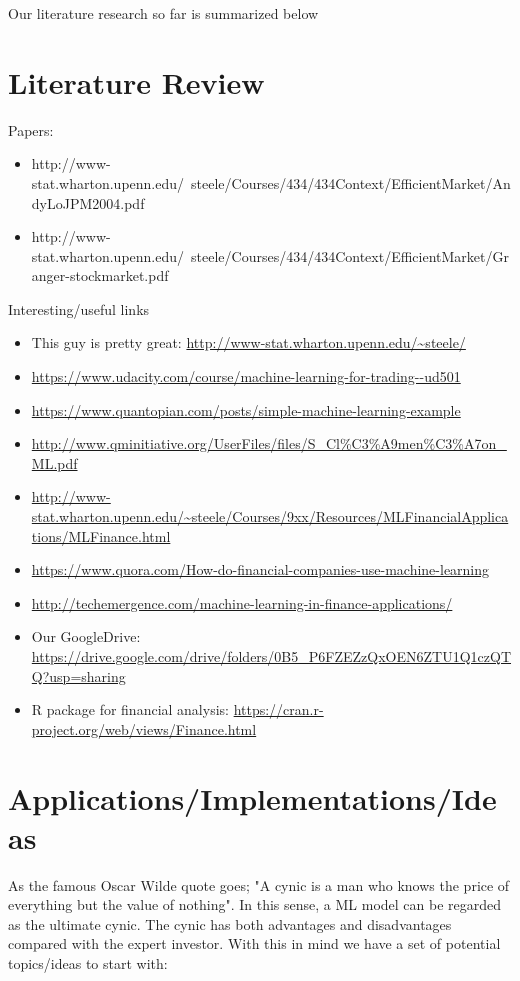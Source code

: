 \documentclass{article}
\begin{document}
Our literature research so far  is summarized below
\section*{Literature Review}


Papers: 
\begin{itemize}
\item http://www-stat.wharton.upenn.edu/~steele/Courses/434/434Context/EfficientMarket/AndyLoJPM2004.pdf

\item http://www-stat.wharton.upenn.edu/~steele/Courses/434/434Context/EfficientMarket/Granger-stockmarket.pdf

\end{itemize}

Interesting/useful links
\begin{itemize}
\item This guy is pretty great: \url{http://www-stat.wharton.upenn.edu/~steele/}
\item \url{https://www.udacity.com/course/machine-learning-for-trading--ud501}
\item \url{https://www.quantopian.com/posts/simple-machine-learning-example}
\item \url{http://www.qminitiative.org/UserFiles/files/S_Cl\%C3\%A9men\%C3\%A7on_ML.pdf}
\item \url{http://www-stat.wharton.upenn.edu/~steele/Courses/9xx/Resources/MLFinancialApplications/MLFinance.html}
\item \url{https://www.quora.com/How-do-financial-companies-use-machine-learning}
\item \url{http://techemergence.com/machine-learning-in-finance-applications/}
\item Our GoogleDrive: \url{https://drive.google.com/drive/folders/0B5_P6FZEZzQxOEN6ZTU1Q1czQTQ?usp=sharing}
\item R package for financial analysis: \url{https://cran.r-project.org/web/views/Finance.html}


\end{itemize}

\section*{Applications/Implementations/Ideas}

As the famous Oscar Wilde quote goes; "A cynic is a man who knows the price of everything but the value of nothing". In this sense, a ML model can be regarded as the ultimate cynic. The cynic has both advantages and disadvantages compared with the expert investor. With this in mind we have a set of potential topics/ideas to start with:
\end{document}
